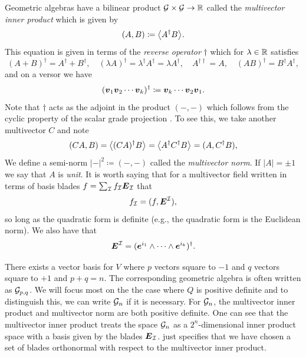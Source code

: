\documentclass{article}
\begin{document}
Geometric algebras have a bilinear product $\mathcal{G} \times \mathcal{G} \to \mathbb{R}$ called the \emph{multivector inner product} which is given by
\begin{equation}
(A,B) \coloneqq \proj{}{A^\dagger B}.
\end{equation}
This equation is given in terms of the \emph{reverse operator} $\dagger$ which for $\lambda \in \mathbb{R}$ satisfies
\begin{equation}
(A+B)^\dagger=A^\dagger + B^\dagger, \quad (\lambda A)^\dagger = \lambda^\dagger A^\dagger = \lambda A^\dagger, \quad A^{\dagger \dagger}=A, \quad (AB)^\dagger = B^\dagger A^\dagger,
\end{equation}
and on a versor we have
\begin{equation}
    (\boldsymbol{v}_1\boldsymbol{v}_2 \cdots \boldsymbol{v}_k)^\dagger \coloneqq \boldsymbol{v}_k \cdots \boldsymbol{v}_2 \boldsymbol{v}_1.
\end{equation}
Note that $\dagger$ acts as the adjoint in the product $(-,-)$ which follows from the cyclic property of the scalar grade projection \cite[eq. (138)]{chisolm_geometric_2012}. To see this, we take another multivector $C$ and note
\begin{align}
(CA,B) = \left\langle(CA)^\dagger B\right\rangle_{} = \left\langle A^\dagger C^\dagger B \right\rangle_{} = (A,C^\dagger B),
\end{align}
We define a semi-norm $|-|^2\coloneqq (-,-)$ called the \emph{multivector norm}. If $|A|=\pm 1$ we say that $A$ is \emph{unit}. It is worth saying that for a multivector field written in terms of basis blades $f=\sum_{\mathcal{I}} f_\mathcal{I} \boldsymbol{E}_\mathcal{I}$ that
\begin{equation}
\label{eq:inner_product_with_basis}
f_\mathcal{I} = (f, \boldsymbol{E}^\mathcal{I}),
\end{equation}
so long as the quadratic form is definite (e.g., the quadratic form is the Euclidean norm). We also have that
\begin{equation}
\boldsymbol{E}^\mathcal{I} = (\boldsymbol{e}^{i_1} \wedge \cdots \wedge \boldsymbol{e}^{i_k})^\dagger.
\end{equation}

There exists a vector basis for $V$ where $p$ vectors square to $-1$ and $q$ vectors square to $+1$ and $p+q=n$. The corresponding geometric algebra is often written as $\mathcal{G}_{p,q}$. We will focus most on the the case where $Q$ is positive definite and to distinguish this, we can write $\mathcal{G}_n$ if it is necessary. For $\mathcal{G}_n$, the multivector inner product and multivector norm are both positive definite. One can see that the multivector inner product treats the space $\mathcal{G}_n$ as a $2^n$-dimensional inner product space with a basis given by the blades $\boldsymbol{E}_\mathcal{I}$.  just specifies that we have chosen a set of blades orthonormal with respect to the multivector inner product.
\end{document}
